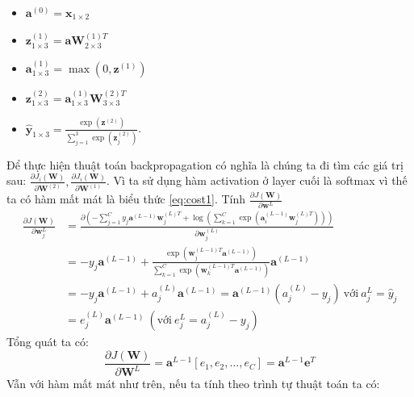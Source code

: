 \begin{itemize}
	\item[] $\textbf{a}^{(0)}=\textbf{x}_{1\times2}$
	\item[]  $\textbf{z}^{(1)}_{1 \times 3}=\textbf{a}\textbf{W}^{(1)T}_{2{\times}3}$
	\item[] $\textbf{a}^{(1)}_{1 \times 3}=\max(0,\textbf{z}^{(1)})$
	
	\item[] $\textbf{z}^{(2)}_{1\times 3}=\textbf{a}^{(1)}_{1 \times 3}\textbf{W}^{(2)T}_{3{{\times}}3 }$
	
	\item[] $\widehat{\textbf{y}}_{1\times 3} = \frac{\exp({\textbf{z}^{(2)}})}{\sum^{3}_{j=1}{\exp({\textbf{z}^{(2)}_j})}}$.

\end{itemize}
Để thực hiện thuật toán backpropagation có nghĩa là chúng ta đi tìm các giá trị sau: $\frac{\partial J_i(\textbf{W})}{\partial \textbf{W}^{(2)}},\frac{\partial J_i(\textbf{W})}{\partial \textbf{W}^{(1)}}$. Vì ta sử dụng hàm activation ở layer cuối là softmax vì thế ta có hàm mất mát là biểu thức \ref{eq:cost1}. Tính $\frac{\partial J(\textbf{W})}{\partial \textbf{w}^{L}} $
\begin{equation}
\begin{split}
\frac{\partial J(\textbf{W})}{\partial \textbf{w}^{L}_j}  
&=\frac{\partial \left( -\sum_{j=1}^C y_{j} \textbf{a}^{(L-1)}\textbf{w}^{(L)T}_{j} + \log\left(\sum_{k=1}^C \exp(\textbf{a}^{(L-1)}_i\textbf{w}^{(L)T}_{j})\right) \right)}{\partial \textbf{w}^{(L)}_j}\\
&=-y_{j}\textbf{a}^{(L-1)} + 
\frac{\exp(\textbf{w}_j^{(L-1)T}\textbf{a}^{(L-1)})}{\sum_{k = 1}^C \exp(\textbf{w}_k^{(L-1)T}\textbf{a}^{(L-1)})}\textbf{a}^{(L-1)} \\
&= -y_{j}\textbf{a}^{(L-1)} + a^{(L)}_{j} \textbf{a}^{(L-1)}= \textbf{a}^{(L-1)} (a^{(L)}_{j} - y_{j})~ \text{với} ~a_j^{L} = \widehat{y}_j \\
&= e^{(L)}_{j}\textbf{a}^{(L-1)} ~(\text{với}~ e^{L}_{j} = a^{(L)}_{j} - y_{j})
\end{split}
\end{equation} 
Tổng quát ta có:
\begin{equation}
\frac{\partial J(\textbf{W})}{\partial \textbf{W}^{L}} = \textbf{a}^{L-1}[e_1,e_2,\ldots,e_C]=\textbf{a}^{L-1}\textbf{e}^{T}
\end{equation}
Vẫn với hàm mất mát như trên, nếu ta tính theo trình tự thuật toán ta có:
